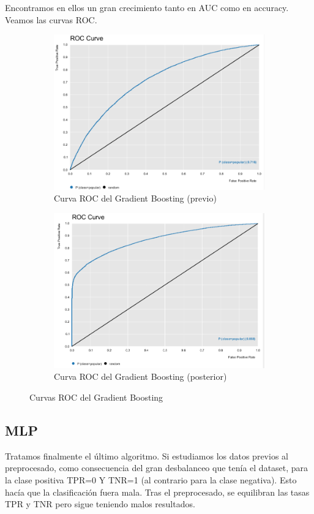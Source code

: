 Encontramos en ellos un gran crecimiento tanto en AUC como en accuracy. Veamos las curvas ROC.

\begin{figure}[H]
	\begin{subfigure}{.5\textwidth}
		\centering
		\includegraphics[width=.4\linewidth]{roc-gb-p.png}
		\caption{Curva ROC del Gradient Boosting (previo)}
		\label{fig:rcgbp}
	\end{subfigure}%
	\begin{subfigure}{.5\textwidth}
		\centering
		\includegraphics[width=.4\linewidth]{roc-gb.png}
		\caption{Curva ROC del Gradient Boosting (posterior)}
		\label{fig:rcgb}
	\end{subfigure}
	\caption{Curvas ROC del Gradient Boosting}
	\label{fig:gb}
\end{figure}

\subsection{MLP}

Tratamos finalmente el último algoritmo. Si estudiamos los datos previos al preprocesado, como consecuencia del gran desbalanceo que tenía el dataset, para la clase positiva TPR=0 Y TNR=1 (al contrario para la clase negativa). Esto hacía que la clasificación fuera mala. Tras el preprocesado, se equilibran las tasas TPR y TNR pero sigue teniendo malos resultados.


